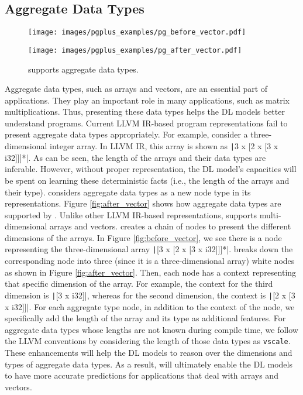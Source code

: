 \subsection{Aggregate Data Types}
\vspace{-8pt}
    \begin{wrapfigure}{R}{.4\textwidth}
    \vspace{-20pt}
        \vspace*{\fill}
        \centering
        {\texttt{[image: images/pgplus\_examples/pg\_before\_vector.pdf]}
        \label{fig:before_vector}}\par\vfill
        {\texttt{[image: images/pgplus\_examples/pg\_after\_vector.pdf]}
        \label{fig:after_vector}}
        \caption{\ourtool supports aggregate data types.}
        \label{fig:vector_support}
        \vspace{-10pt}
    \end{wrapfigure}
Aggregate data types, such as arrays and vectors, are an essential part of applications. They play an important role in many applications, such as matrix multiplications. Thus, presenting these data types helps the DL models better understand programs. 
Current LLVM IR-based program representations fail to present aggregate data types appropriately.
For example, consider a three-dimensional integer array. In LLVM IR, this array is shown as \texttt|3 x [2 x [3 x i32]]]*|.
As can be seen, the length of the arrays and their data types are inferable. However, without proper representation, the DL model's capacities will be spent on learning these deterministic facts (i.e., the length of the arrays and their type).
\ourtool considers aggregate data types as a new node type in its representations.
Figure \ref{fig:after_vector} shows how aggregate data types are supported by \ourtool.
Unlike other LLVM IR-based representations, \ourtool supports multi-dimensional arrays and vectors.
\ourtool creates a chain of nodes to present the different dimensions of the arrays. In Figure \ref{fig:before_vector}, we see there is a node representing the three-dimensional array \texttt|[3 x [2 x [3 x i32]]]*|. \ourtool breaks down the corresponding node into three (since it is a three-dimensional array) white nodes as shown in Figure \ref{fig:after_vector}. Then, each node has a context representing that specific dimension of the array. For example, the context for the third dimension is \texttt|[3 x i32]|, whereas for the second dimension, the context is \texttt|[2 x [3 x i32]]|.
For each aggregate type node, in addition to the context of the node, we specifically add the length of the array and its type as additional features.
For aggregate data types whose lengths are not known during compile time, we follow the LLVM conventions by considering the length of those data types as \texttt{vscale}.
These enhancements will help the DL models to reason over the dimensions and types of aggregate data types. As a result, \ourtool will ultimately enable the DL models to have more accurate predictions for applications that deal with arrays and vectors.

\vspace{-11pt}